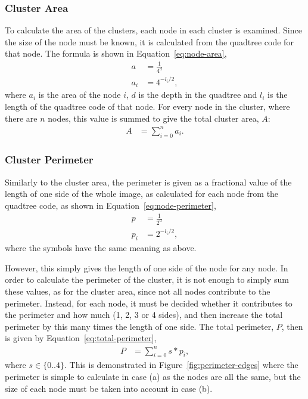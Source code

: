 \subsubsection{Cluster Area}
\label{ssub:cluster_area_node}

To calculate the area of the clusters, each node in each cluster is examined.
Since the size of the node must be known, it is calculated from the quadtree
code for that node. The formula is shown in Equation~\ref{eq:node-area},
\begin{align}
	a &= \frac{1}{4^{d}} \\
	a_i &= 4^{-l_i/2}, \label{eq:node-area}
\end{align}
where $a_i$ is the area of the node $i$, $d$ is the depth in the quadtree and
$l_i$ is the length of the quadtree code of that node. For every node in the
cluster, where there are $n$ nodes, this value is summed to give the total
cluster area, $A$:
\begin{align}
	A &= \sum_{i=0}^{n} a_i.
\end{align}

\subsubsection{Cluster Perimeter}
\label{ssub:cluster_perimeter_node}

Similarly to the cluster area, the perimeter is given as a fractional value of
the length of one side of the whole image, as calculated for each node from the
quadtree code, as shown in Equation~\ref{eq:node-perimeter},
\begin{align}
	p &= \frac{1}{2^{d}} \\
	p_i &= 2^{-l_i/2}, \label{eq:node-perimeter}
\end{align}
where the symbols have the same meaning as above.

However, this simply gives the length of one side of the node for any node. In
order to calculate the perimeter of the cluster, it is not enough to simply
sum these values, as for the cluster area, since not all nodes contribute to
the perimeter. Instead, for each node, it must be decided whether it
contributes to the perimeter and how much (1, 2, 3 or 4 sides), and then
increase the total perimeter by this many times the length of one side. The
total perimeter, $P$, then is given by Equation~\ref{eq:total-perimeter},
\begin{align}
	P &= \sum_{i=0}^{n} s * p_i, \label{eq:total-perimeter}
\end{align}
where $s \in \{0..4\}$. This is demonstrated in
Figure~\ref{fig:perimeter-edges} where the perimeter is simple to calculate in
case (a) as the nodes are all the same, but the size of each node must be taken
into account in case (b).


